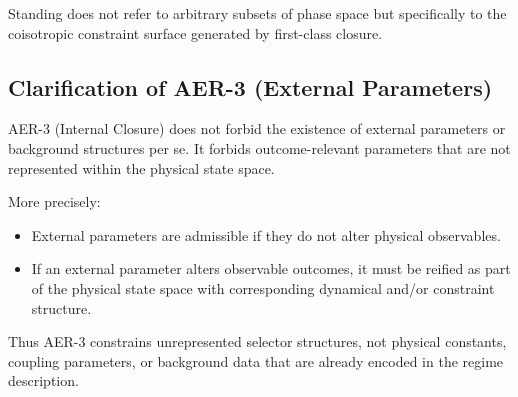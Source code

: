 \documentclass[11pt]{article}
\theoremstyle{remark}
\theoremstyle{plain}
\begin{document}
Standing does not refer to arbitrary subsets of phase space
but specifically to the coisotropic constraint surface generated by first-class closure.

\subsection{Clarification of AER-3 (External Parameters)}

AER-3 (Internal Closure) does not forbid the existence of external parameters or background structures per se.
It forbids outcome-relevant parameters that are not represented within the physical state space.

More precisely:

\begin{itemize}
\item External parameters are admissible if they do not alter physical observables.
\item If an external parameter alters observable outcomes, it must be reified
as part of the physical state space with corresponding dynamical and/or constraint structure.
\end{itemize}

Thus AER-3 constrains unrepresented selector structures,
not physical constants, coupling parameters, or background data that are already encoded in the regime description.
\end{document}
